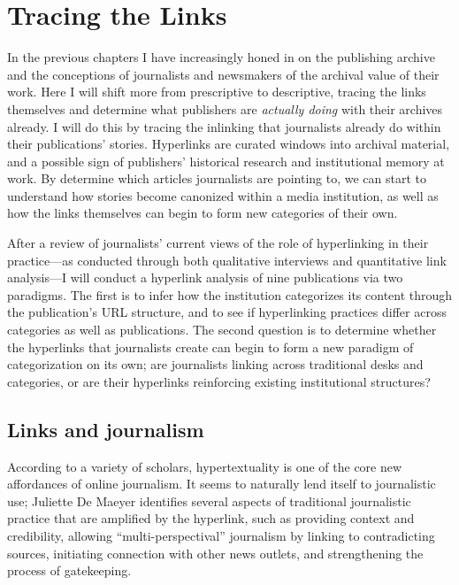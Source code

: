 \chapter{Tracing the Links}

In the previous chapters I have increasingly honed in on the publishing archive and the conceptions of journalists and newsmakers of the archival value of their work. Here I will shift more from prescriptive to descriptive, tracing the links themselves and determine what publishers are \emph{actually doing} with their archives already. I will do this by tracing the inlinking that journalists already do within their publications' stories. Hyperlinks are curated windows into archival material, and a possible sign of publishers' historical research and institutional memory at work. By determine which articles journalists are pointing to, we can start to understand how stories become canonized within a media institution, as well as how the links themselves can begin to form new categories of their own.

After a review of journalists' current views of the role of hyperlinking in their practice---as conducted through both qualitative interviews and quantitative link analysis---I will conduct a hyperlink analysis of nine publications via two paradigms. The first is to infer how the institution categorizes its content through the publication's URL structure, and to see if hyperlinking practices differ across categories as well as publications. The second question is to determine whether the hyperlinks that journalists create can begin to form a new paradigm of categorization on its own; are journalists linking across traditional desks and categories, or are their hyperlinks reinforcing existing institutional structures?

\section{Links and journalism}

According to a variety of scholars, hypertextuality is one of the core new affordances of online journalism.\autocite{deuze etc.} It seems to naturally lend itself to journalistic use; Juliette De Maeyer identifies several aspects of traditional journalistic practice that are amplified by the hyperlink, such as providing context and credibility, allowing ``multi-perspectival'' journalism by linking to contradicting sources, initiating connection with other news outlets, and strengthening the process of gatekeeping.

